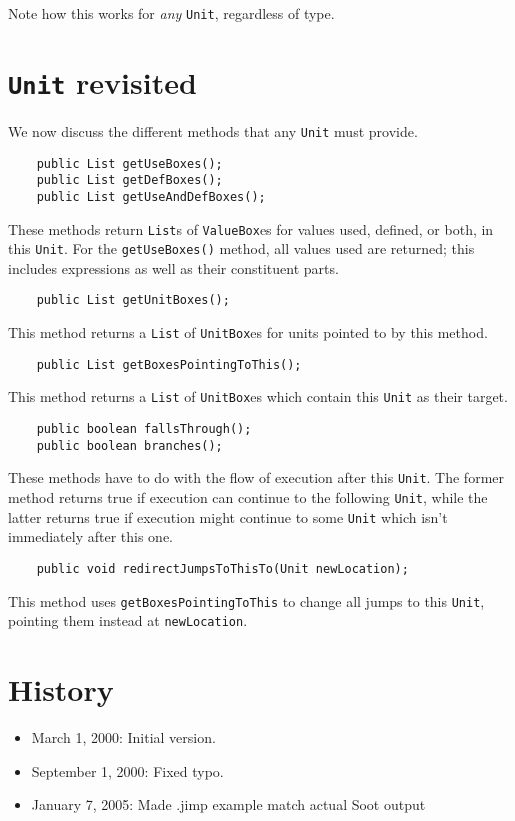 \documentclass{article}
\begin{document}
Note how this works for {\em any} {\tt Unit}, regardless of type.

\section{{\tt Unit} revisited}

We now discuss the different methods that any {\tt Unit} must provide.

\begin{verbatim}
    public List getUseBoxes();
    public List getDefBoxes();
    public List getUseAndDefBoxes();
\end{verbatim}

These methods return {\tt List}s of {\tt ValueBox}es for values used,
defined, or both, in this {\tt Unit}.  For the {\tt getUseBoxes()} method,
all values used are returned; this includes expressions as well as their
constituent parts.

\begin{verbatim}
    public List getUnitBoxes();
\end{verbatim}

This method returns a {\tt List} of {\tt UnitBox}es for units
pointed to by this method.

\begin{verbatim}
    public List getBoxesPointingToThis();
\end{verbatim}

This method returns a {\tt List} of {\tt UnitBox}es which contain
this {\tt Unit} as their target.

\begin{verbatim}
    public boolean fallsThrough();
    public boolean branches();        
\end{verbatim}

These methods have to do with the flow of execution after this
{\tt Unit}. The former method returns true if execution can continue
to the following {\tt Unit}, while the latter returns true if
execution might continue to some {\tt Unit} which isn't immediately
after this one.
    
\begin{verbatim}
    public void redirectJumpsToThisTo(Unit newLocation);
\end{verbatim}

This method uses {\tt getBoxesPointingToThis} to change all
jumps to this {\tt Unit}, pointing them instead at {\tt newLocation}.

\section{History}
\begin{itemize}
\item March 1, 2000: Initial version.
\item September 1, 2000: Fixed typo.
\item January 7, 2005: Made .jimp example match actual Soot output
\end{itemize}
\end{document}
